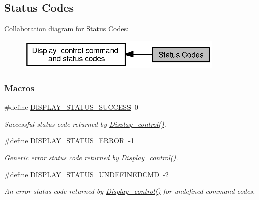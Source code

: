 \subsection{Status Codes}
\label{group___d_i_s_p_l_a_y___s_t_a_t_u_s}
Collaboration diagram for Status Codes\+:
\nopagebreak
\begin{figure}[H]
\begin{center}
\leavevmode
\includegraphics[width=281pt]{group___d_i_s_p_l_a_y___s_t_a_t_u_s}
\end{center}
\end{figure}
\subsubsection*{Macros}
\begin{DoxyCompactItemize}
\item 
\#define \hyperlink{group___d_i_s_p_l_a_y___s_t_a_t_u_s_ga4f6a4a10f24cf55bc13d1750e38bb946}{D\+I\+S\+P\+L\+A\+Y\+\_\+\+S\+T\+A\+T\+U\+S\+\_\+\+S\+U\+C\+C\+E\+S\+S}~0
\begin{DoxyCompactList}\small\item\em Successful status code returned by \hyperlink{_display_8h_ad623d21e3c6d821bf6f4bdcfa05ec21f}{Display\+\_\+control()}. \end{DoxyCompactList}\item 
\#define \hyperlink{group___d_i_s_p_l_a_y___s_t_a_t_u_s_gaf91798b06dd95fce8063b7328420fab3}{D\+I\+S\+P\+L\+A\+Y\+\_\+\+S\+T\+A\+T\+U\+S\+\_\+\+E\+R\+R\+O\+R}~-\/1
\begin{DoxyCompactList}\small\item\em Generic error status code returned by \hyperlink{_display_8h_ad623d21e3c6d821bf6f4bdcfa05ec21f}{Display\+\_\+control()}. \end{DoxyCompactList}\item 
\#define \hyperlink{group___d_i_s_p_l_a_y___s_t_a_t_u_s_ga3e506301dbdad496a95e12c3b17efc6b}{D\+I\+S\+P\+L\+A\+Y\+\_\+\+S\+T\+A\+T\+U\+S\+\_\+\+U\+N\+D\+E\+F\+I\+N\+E\+D\+C\+M\+D}~-\/2
\begin{DoxyCompactList}\small\item\em An error status code returned by \hyperlink{_display_8h_ad623d21e3c6d821bf6f4bdcfa05ec21f}{Display\+\_\+control()} for undefined command codes. \end{DoxyCompactList}\end{DoxyCompactItemize}


